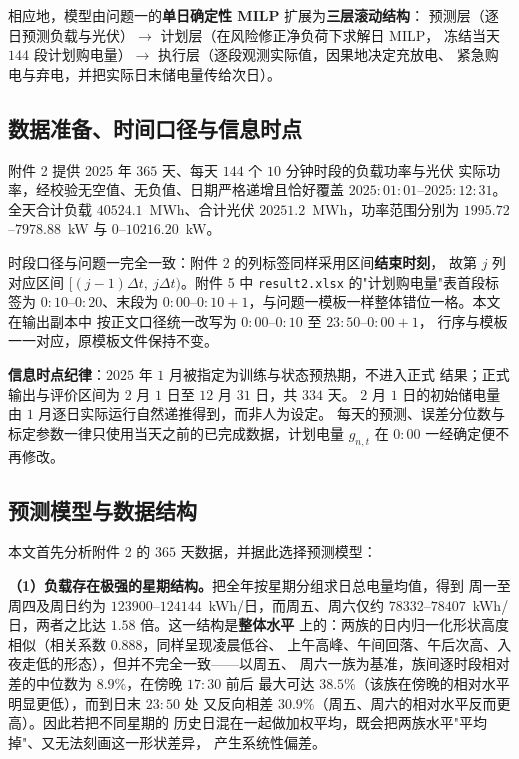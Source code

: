 \documentclass[withoutpreface,bwprint]{cumcmthesis}
\begin{document}
相应地，模型由问题一的\textbf{单日确定性 MILP} 扩展为\textbf{三层滚动结构}：
预测层（逐日预测负载与光伏）$\to$ 计划层（在风险修正净负荷下求解日 MILP，
冻结当天 $144$ 段计划购电量）$\to$ 执行层（逐段观测实际值，因果地决定充放电、
紧急购电与弃电，并把实际日末储电量传给次日）。

\subsection{数据准备、时间口径与信息时点}

附件 2 提供 2025 年 $365$ 天、每天 $144$ 个 $10$ 分钟时段的负载功率与光伏
实际功率，经校验无空值、无负值、日期严格递增且恰好覆盖
$2025{:}01{:}01$--$2025{:}12{:}31$。全天合计负载 $40524.1$~MWh、合计光伏
$20251.2$~MWh，功率范围分别为 $1995.72$--$7978.88$~kW 与
$0$--$10216.20$~kW。

时段口径与问题一完全一致：附件 2 的列标签同样采用区间\textbf{结束时刻}，
故第 $j$ 列对应区间 $[(j-1)\Delta t,\ j\Delta t)$。附件 5 中
\texttt{result2.xlsx} 的"计划购电量"表首段标签为 $0{:}10$--$0{:}20$、末段为
$0{:}00$--$0{:}10{+}1$，与问题一模板一样整体错位一格。本文在输出副本中
按正文口径统一改写为 $0{:}00$--$0{:}10$ 至 $23{:}50$--$0{:}00{+}1$，
行序与模板一一对应，原模板文件保持不变。

\textbf{信息时点纪律}：$2025$ 年 $1$ 月被指定为训练与状态预热期，不进入正式
结果；正式输出与评价区间为 $2$ 月 $1$ 日至 $12$ 月 $31$ 日，共 $334$ 天。
$2$ 月 $1$ 日的初始储电量由 $1$ 月逐日实际运行自然递推得到，而非人为设定。
每天的预测、误差分位数与标定参数一律只使用当天之前的已完成数据，计划电量
$g_{n,t}$ 在 $0{:}00$ 一经确定便不再修改。

\subsection{预测模型与数据结构}

本文首先分析附件 2 的 $365$ 天数据，并据此选择预测模型：

\textbf{（1）负载存在极强的星期结构。}把全年按星期分组求日总电量均值，得到
周一至周四及周日约为 $123900$--$124144$~kWh/日，而周五、周六仅约
$78332$--$78407$~kWh/日，两者之比达 $1.58$ 倍。这一结构是\textbf{整体水平}
上的：两族的日内归一化形状高度相似（相关系数 $0.888$，同样呈现凌晨低谷、
上午高峰、午间回落、午后次高、入夜走低的形态），但并不完全一致——以周五、
周六一族为基准，族间逐时段相对差的中位数为 $8.9\%$，在傍晚 $17{:}30$ 前后
最大可达 $38.5\%$（该族在傍晚的相对水平明显更低），而到日末 $23{:}50$ 处
又反向相差 $30.9\%$（周五、周六的相对水平反而更高）。因此若把不同星期的
历史日混在一起做加权平均，既会把两族水平"平均掉"、又无法刻画这一形状差异，
产生系统性偏差。
\end{document}
